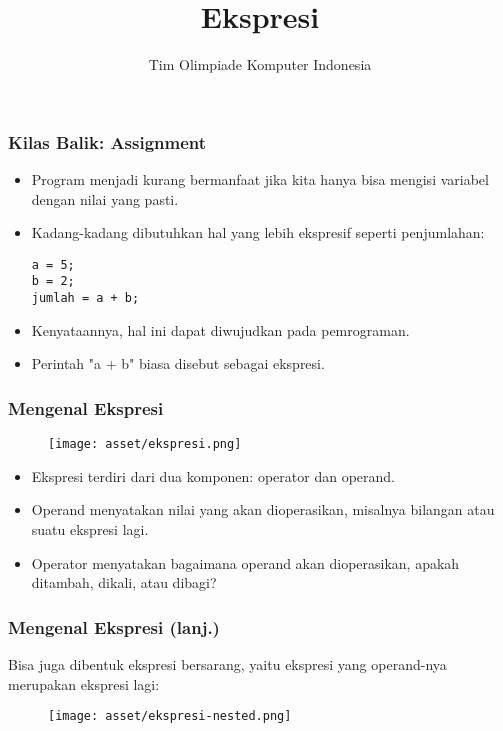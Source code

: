 

\title{Ekspresi}
\author{Tim Olimpiade Komputer Indonesia}
\date{}



\begin{frame}
\titlepage
\end{frame}

\begin{frame}[fragile]
\frametitle{Kilas Balik: Assignment}
\begin{itemize}
  \item Program menjadi kurang bermanfaat jika kita hanya bisa mengisi variabel dengan nilai yang pasti. 
  \item Kadang-kadang dibutuhkan hal yang lebih ekspresif seperti penjumlahan:
\begin{lstlisting}
a = 5;
b = 2;
jumlah = a + b;
\end{lstlisting}
  \item Kenyataannya, hal ini dapat diwujudkan pada pemrograman.
  \item Perintah "a + b" biasa disebut sebagai \alert{ekspresi}.
\end{itemize}
\end{frame}

\begin{frame}
\frametitle{Mengenal Ekspresi}
\begin{figure}
  \centering
  \texttt{[image: asset/ekspresi.png]}
\end{figure}
\begin{itemize}
  \item Ekspresi terdiri dari dua komponen: \alert{operator} dan \alert{operand}.
  \item Operand menyatakan nilai yang akan dioperasikan, misalnya bilangan atau suatu ekspresi lagi.
  \item Operator menyatakan bagaimana operand akan dioperasikan, apakah ditambah, dikali, atau dibagi?
\end{itemize}
\end{frame}

\begin{frame}
\frametitle{Mengenal Ekspresi (lanj.)}
Bisa juga dibentuk ekspresi bersarang, yaitu ekspresi yang operand-nya merupakan ekspresi lagi:
\begin{figure}
  \centering
  \texttt{[image: asset/ekspresi-nested.png]}
\end{figure}
\end{frame}

